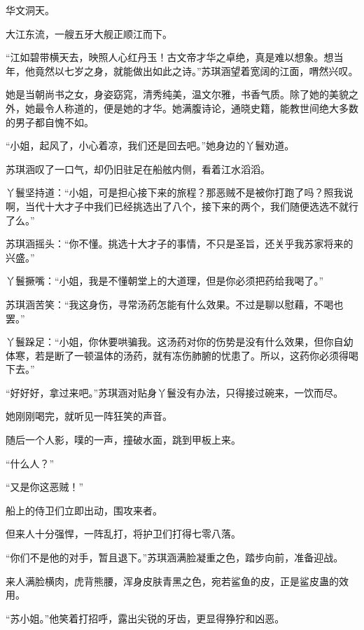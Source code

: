 
\begin{this_body}



华文洞天。

大江东流，一艘五牙大舰正顺江而下。

“江如碧带横天去，映照人心红丹玉！古文帝才华之卓绝，真是难以想象。想当年，他竟然以七岁之身，就能做出如此之诗。”苏琪涵望着宽阔的江面，喟然兴叹。

她是当朝尚书之女，身姿窈窕，清秀纯美，温文尔雅，书香气质。除了她的美貌之外，她最令人称道的，便是她的才华。她满腹诗论，通晓史籍，能教世间绝大多数的男子都自愧不如。

“小姐，起风了，小心着凉，我们还是回去吧。”她身边的丫鬟劝道。

苏琪涵叹了一口气，却仍旧驻足在船舷内侧，看着江水滔滔。

丫鬟坚持道：“小姐，可是担心接下来的旅程？那恶贼不是被你打跑了吗？照我说啊，当代十大才子中我们已经挑选出了八个，接下来的两个，我们随便选选不就行了么。”

苏琪涵摇头：“你不懂。挑选十大才子的事情，不只是圣旨，还关乎我苏家将来的兴盛。”

丫鬟撅嘴：“小姐，我是不懂朝堂上的大道理，但是你必须把药给我喝了。”

苏琪涵苦笑：“我这身伤，寻常汤药怎能有什么效果。不过是聊以慰藉，不喝也罢。”

丫鬟跺足：“小姐，你休要哄骗我。这汤药对你的伤势是没有什么效果，但你自幼体寒，若是断了一顿温体的汤药，就有冻伤肺腑的忧患了。所以，这药你必须得喝下去。”

“好好好，拿过来吧。”苏琪涵对贴身丫鬟没有办法，只得接过碗来，一饮而尽。

她刚刚喝完，就听见一阵狂笑的声音。

随后一个人影，噗的一声，撞破水面，跳到甲板上来。

“什么人？”

“又是你这恶贼！”

船上的侍卫们立即出动，围攻来者。

但来人十分强悍，一阵乱打，将护卫们打得七零八落。

“你们不是他的对手，暂且退下。”苏琪涵满脸凝重之色，踏步向前，准备迎战。

来人满脸横肉，虎背熊腰，浑身皮肤青黑之色，宛若鲨鱼的皮，正是鲨皮蛊的效用。

“苏小姐。”他笑着打招呼，露出尖锐的牙齿，更显得狰狞和凶恶。


\end{this_body}
